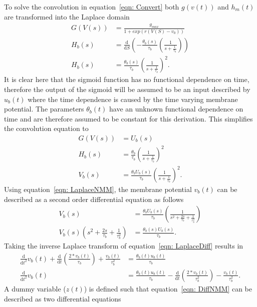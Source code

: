 To solve the convolution in equation~\ref{eqn: Convert} both $g(v(t))$ and $h_{m}(t)$ are transformed into the Laplace domain \begin{align}%
\label{eqn: Laplace}
G(V(s)) &= \frac{g_{max}}{1+exp(r(V(S)-v_{0}))}\\
H_{b}(s) &= \frac{\mathrm{d}}{\mathrm{d}S}\left(-\frac{\theta_{b}(s)}{\tau_{b}}\left(\frac{1}{s+\frac{1}{\tau_{b}}}\right)\right)\\
H_{b}(s) &= \frac{\theta_{b}(s)}{\tau_{b}}\left(\frac{1}{s+\frac{1}{\tau_{b}}}\right)^2.
\end{align} It is clear here that the sigmoid function has no functional dependence on time, therefore the output of the sigmoid will be assumed to be an input described by $u_{b}(t)$ where the time dependence is caused by the time varying membrane potential. The parameters $\theta_b(t)$ have an unknown functional dependence on time and are therefore assumed to be constant for this derivation. This simplifies the convolution equation to \begin{align}%
G(V(s)) &= U_{b}(s)\\
H_{b}(s) &= \frac{\theta_{b}}{\tau_{b}}\left(\frac{1}{s+\frac{1}{\tau_{b}}}\right)^2\\
\label{eqn: LaplaceNMM}
V_{b}(s) &= \frac{\theta_{b}U_{b}(s)}{\tau_{b}}\left(\frac{1}{s+\frac{1}{\tau_{b}}}\right)^2.
\end{align} Using equation~\ref{eqn: LaplaceNMM}, the membrane potential $v_{b}(t)$ can be described as a second order differential equation as follows \begin{align}%
V_{b}(s) &= \frac{\theta_{b}U_{b}(s)}{\tau_{b}}\left(\frac{1}{s^2+\frac{2s}{\tau_{b}}+\frac{1}{\tau^2_{b}}}\right)\\
\label{eqn: LaplaceDiff}
V_{b}(s)\left(s^2+\frac{2s}{\tau_{b}}+\frac{1}{\tau^2_{b}}\right) &= \frac{\theta_{b}(s)U_{b}(s)}{\tau_{b}}.
\end{align} Taking the inverse Laplace transform of equation~\ref{eqn: LaplaceDiff} results in \begin{align} %
\frac{\mathrm{d}}{\mathrm{d}t^2}v_{b}(t) + \frac{\mathrm{d}}{\mathrm{d}t}\left(\frac{2*v_{b}(t)}{\tau_{b}}\right) + \frac{v_{b}(t)}{\tau^2_{b}} &= \frac{\theta_{b}(t)u_{b}(t)}{\tau_{b}}\\
\label{eqn: DiffNMM}
\frac{\mathrm{d}}{\mathrm{d}t^2}v_{b}(t) &= \frac{\theta_{b}(t)u_{b}(t)}{\tau_{b}} - \frac{\mathrm{d}}{\mathrm{d}t}\left(\frac{2*v_{b}(t)}{\tau^2_{b}}\right) -\frac{v_{b}(t)}{\tau^2_{b}}. \end{align} A dummy  variable ($z(t)$) is defined such that equation~\ref{eqn: DiffNMM} can be described as two differential equations \begin{align} %

\end{align}
